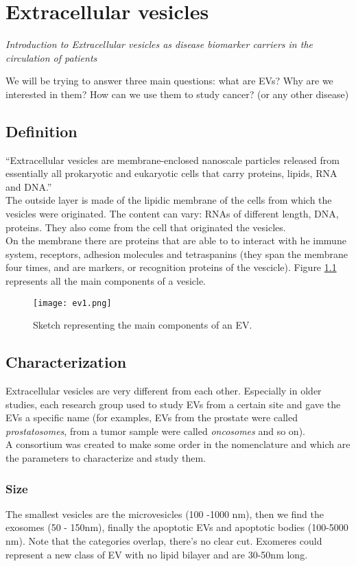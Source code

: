 \graphicspath{{chapters/ev/}}
\chapter{Extracellular vesicles}
\emph{Introduction to Extracellular vesicles as disease biomarker carriers in the circulation of patients}

We will be trying to answer three main questions: what are EVs? Why are we interested in them? How can we use them to study cancer? (or any other disease)

\section{Definition}
“Extracellular vesicles are membrane-enclosed nanoscale particles released from essentially all prokaryotic and eukaryotic cells that carry proteins, lipids, RNA and DNA.”
\\
The outside layer is made of the lipidic membrane of the cells from which the vesicles were originated.
The content can vary: RNAs of different length, DNA, proteins. They also come from the cell that originated the vesicles.\\
On the membrane there are proteins that are able to to interact with he immune system, receptors, adhesion molecules and tetraspanins (they span the membrane four times, and are markers, or recognition proteins of the vescicle).
Figure \ref{fig:ev1} represents all the main components of a vesicle.
\begin{figure}[H]
    \centering
    \texttt{[image: ev1.png]}
    \caption{Sketch representing the main components of an EV.}
    \label{fig:ev1}
\end{figure}

\section{Characterization}
Extracellular vesicles are very different from each other.
Especially in older studies, each research group used to study EVs from a certain site and gave the EVs a specific name (for examples, EVs from the prostate were called \textit{prostatosomes}, from a tumor sample were called \textit{oncosomes} and so on).
\\
A consortium was created to make some order in the nomenclature and which are the parameters to characterize and study them.

\subsection{Size}
The smallest vesicles are the microvesicles (100 -1000 nm), then we find the exosomes (50 - 150nm), finally the apoptotic EVs and apoptotic bodies (100-5000 nm). Note that the categories overlap, there's no clear cut. Exomeres could represent a new class of EV with no lipid bilayer and are 30-50nm long.

